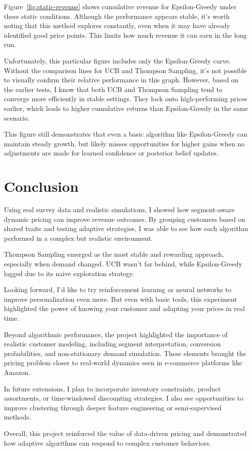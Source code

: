 \documentclass[12pt]{article}
\begin{document}
Figure~\ref{fig:static-revenue} shows cumulative revenue for Epsilon-Greedy under these static conditions. Although the performance appears stable, it’s worth noting that this method explores constantly, even when it may have already identified good price points. This limits how much revenue it can earn in the long run.

Unfortunately, this particular figure includes only the Epsilon-Greedy curve. Without the comparison lines for UCB and Thompson Sampling, it’s not possible to visually confirm their relative performance in this graph. However, based on the earlier tests, I know that both UCB and Thompson Sampling tend to converge more efficiently in stable settings. They lock onto high-performing prices earlier, which leads to higher cumulative returns than Epsilon-Greedy in the same scenario.

This figure still demonstrates that even a basic algorithm like Epsilon-Greedy can maintain steady growth, but likely misses opportunities for higher gains when no adjustments are made for learned confidence or posterior belief updates.


\section{Conclusion}

Using real survey data and realistic simulations, I showed how segment-aware dynamic pricing can improve revenue outcomes. By grouping customers based on shared traits and testing adaptive strategies, I was able to see how each algorithm performed in a complex but realistic environment.

Thompson Sampling emerged as the most stable and rewarding approach, especially when demand changed. UCB wasn’t far behind, while Epsilon-Greedy lagged due to its naive exploration strategy.

Looking forward, I’d like to try reinforcement learning or neural networks to improve personalization even more. But even with basic tools, this experiment highlighted the power of knowing your customer and adapting your prices in real time.

Beyond algorithmic performance, the project highlighted the importance of realistic customer modeling, including segment interpretation, conversion probabilities, and non-stationary demand simulation. These elements brought the pricing problem closer to real-world dynamics seen in e-commerce platforms like Amazon.

In future extensions, I plan to incorporate inventory constraints, product assortments, or time-windowed discounting strategies. I also see opportunities to improve clustering through deeper feature engineering or semi-supervised methods.

Overall, this project reinforced the value of data-driven pricing and demonstrated how adaptive algorithms can respond to complex customer behaviors.
\end{document}
